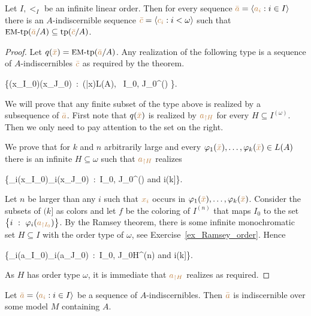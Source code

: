 \begin{void}\label{thm_EM}
  Let $I,<_I$ be an infinite linear order.
  Then for every sequence ${\color{brown}\bar a}=\langle{\color{brown}a_i}:i\in I\rangle$ there is an $A$-indiscernible sequence ${\color{brown}\bar c}=\langle{\color{brown}c_i}:i<\omega\rangle$ such that $\mbox{{\small EM}-tp}({\color{brown}\bar a}/A)\subseteq{\rm tp}({\color{brown}\bar c}/A)$.  
\end{void}
\begin{proof}
Let $q({\color{brown}\bar x})=\mbox{{\small EM}-tp}({\color{brown}\bar a}/A)$.
Any realization of the following type is a sequence of $A$-indiscernibles ${\color{brown}\bar c}$ as required by the theorem.

{\cup}
{\Big\{\phi({\mr x_{\restriction I_0}})\iff\phi({\mr x_{\restriction J_0}})\ :\  \phi({\mr\bar x})\in L(A), \ I_0, J_0\in\omega^{(\omega)} \Big\}.}

We will prove that any finite subset of the type above is realized by a subsequence of ${\color{brown}\bar a}$.
First note that $q({\color{brown}\bar x})$ is realized by ${\color{brown} a_{\restriction H}}$ for every $H\subseteq I^{(\omega)}$.
Then we only need to pay attention to the set on the right.

We prove that for $k$ and $n$ arbitrarily large and every $\varphi_1({\color{brown}\bar x}),\dots,\varphi_k({\color{brown}\bar x})\in L(A)$ there is an infinite $H\subseteq\omega$ such that ${\color{brown} a_{\restriction H}}$ realizes

\ceq{\ssf{\#}}
{}
{\Big\{\phi_i({\mr x_{\restriction I_0}})\iff\phi_i({\mr x_{\restriction J_0}})\ :\  I_0, J_0\in\omega^{(\omega)}\textrm{ and } i\in(k]\Big\}.}

Let $n$ be larger than any $i$ such that ${\color{brown} x_i}$ occurs in $\varphi_1({\color{brown}\bar x}),\dots,\varphi_k({\color{brown}\bar x})$.
Consider the subsets of $(k]$ as colors and let $f$ be the coloring of $I^{(n)}$ that maps $I_0$ to the set $\big\{i\ :\ \varphi_i({\color{brown} a_{\restriction I_0}})\big\}$.
By the Ramsey theorem,
there is some infinite monochromatic set $H\subseteq I$ with the order type of $\omega$, see Exercise~\ref{ex_Ramsey_order}.
Hence

\ceq{}
{}
{\Big\{\phi_i({\mr a_{\restriction I_0}})\iff\phi_i({\mr a_{\restriction J_0}})\ :\  I_0, J_0\in H^{(n)}\textrm{ and } i\in(k]\Big\}.}

As $H$ has order type $\omega$,
it is immediate that ${\color{brown} a_{\restriction H}}$ realizes \ssf{\#}
as required.
\end{proof}

\begin{proposition}\label{prop_indiscernibles_set_model}
Let ${\color{brown}\bar a}=\langle{\color{brown}a_i}:i\in I\rangle$ be a sequence of $A$-indiscernibles.
Then ${\color{brown}\bar a}$ is indiscernible over some model $M$ containing $A$.
\end{proposition}

